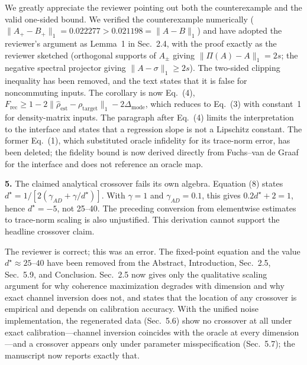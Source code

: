\documentclass[11pt,a4paper]{article}
\newcommand{\rev}[1]{{\color{black}#1}}
\newcommand{\resp}[1]{{\color{red}#1}}
\newcommand{\Frec}{F_\mathrm{rec}}
\begin{document}
\resp{We greatly appreciate the reviewer pointing out both the counterexample and the valid one-sided bound. We verified the counterexample numerically ($\|A_+ - B_+\|_1 = 0.022277 > 0.021198 = \|A - B\|_1$) and have adopted the reviewer's argument as Lemma~1 in Sec.~2.4, with the proof exactly as the reviewer sketched (orthogonal supports of $A_\pm$ giving $\|\Pi(A) - A\|_1 = 2s$; the negative spectral projector giving $\|A - \sigma\|_1 \geq 2s$). The two-sided clipping inequality has been removed, and the text states that it is false for noncommuting inputs. The corollary is now Eq.~(4), $\Frec \geq 1 - 2\|\hat\rho_\mathrm{est} - \rho_\mathrm{target}\|_1 - 2\Delta_\mathrm{mode}$, which reduces to Eq.~(3) with constant~1 for density-matrix inputs. The paragraph after Eq.~(4) limits the interpretation to the interface and states that a regression slope is not a Lipschitz constant. The former Eq.~(1), which substituted oracle infidelity for its trace-norm error, has been deleted; the fidelity bound is now derived directly from Fuchs--van de Graaf for the interface and does not reference an oracle map.}

\rev{\textbf{5.} The claimed analytical crossover fails its own algebra. Equation (8) states $d^\star = 1/[2(\gamma_{AD} + \gamma/d^\star)]$. With $\gamma = 1$ and $\gamma_{AD} = 0.1$, this gives $0.2 d^\star + 2 = 1$, hence $d^\star = -5$, not 25--40. The preceding conversion from elementwise estimates to trace-norm scaling is also unjustified. This derivation cannot support the headline crossover claim.}

\resp{The reviewer is correct; this was an error. The fixed-point equation and the value $d^\star \approx 25$--$40$ have been removed from the Abstract, Introduction, Sec.~2.5, Sec.~5.9, and Conclusion. Sec.~2.5 now gives only the qualitative scaling argument for why coherence maximization degrades with dimension and why exact channel inversion does not, and states that the location of any crossover is empirical and depends on calibration accuracy. With the unified noise implementation, the regenerated data (Sec.~5.6) show no crossover at all under exact calibration---channel inversion coincides with the oracle at every dimension---and a crossover appears only under parameter misspecification (Sec.~5.7); the manuscript now reports exactly that.}
\end{document}
